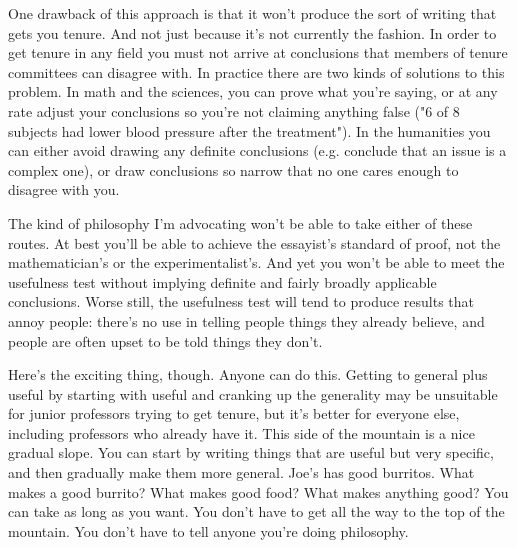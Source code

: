 One drawback of this approach is that
                  it won't produce the sort of writing that gets you tenure. And
                  not just because it's not currently the fashion. In order to
                  get tenure in any field you must not arrive at conclusions
                  that members of tenure committees can disagree with. In
                  practice there are two kinds of solutions to this problem. In
                  math and the sciences, you can prove what you're saying, or at
                  any rate adjust your conclusions so you're not claiming
                  anything false ("6 of 8 subjects had lower blood pressure
                  after the treatment"). In the humanities you can either avoid
                  drawing any definite conclusions (e.g. conclude that an issue
                  is a complex one), or draw conclusions so narrow that no one
                  cares enough to disagree with you.

The kind of
                  philosophy I'm advocating won't be able to take either of
                  these routes. At best you'll be able to achieve the essayist's
                  standard of proof, not the mathematician's or the
                  experimentalist's. And yet you won't be able to meet the
                  usefulness test without implying definite and fairly broadly
                  applicable conclusions. Worse still, the usefulness test will
                  tend to produce results that annoy people: there's no use in
                  telling people things they already believe, and people are
                  often upset to be told things they don't.

Here's
                  the exciting thing, though. Anyone can do this. Getting to
                  general plus useful by starting with useful and cranking up
                  the generality may be unsuitable for junior professors trying
                  to get tenure, but it's better for everyone else, including
                  professors who already have it. This side of the mountain is a
                  nice gradual slope. You can start by writing things that are
                  useful but very specific, and then gradually make them more
                  general. Joe's has good burritos. What makes a good burrito?
                  What makes good food? What makes anything good? You can take
                  as long as you want. You don't have to get all the way to the
                  top of the mountain. You don't have to tell anyone you're
                  doing philosophy.

